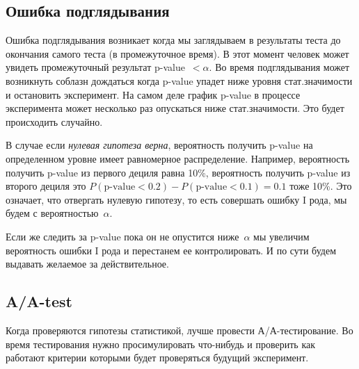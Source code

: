 \documentclass[../handbook.tex]{subfiles}
\begin{document}
\subsection{Ошибка подглядывания}
Ошибка подглядывания возникает когда мы заглядываем в результаты теста до
окончания самого теста (в промежуточное время). В этот момент человек может
увидеть промежуточный результат p-value~$< \alpha$. Во время подглядывания
может возникнуть соблазн дождаться когда p-value упадет ниже уровня
стат.значимости и остановить эксперимент. На самом деле график p-value в
процессе эксперимента может несколько раз опускаться ниже стат.значимости. Это
будет происходить случайно.


В случае если \emph{нулевая гипотеза верна}, вероятность получить p-value на
определенном уровне имеет равномерное распределение. Например, вероятность
получить p-value из первого дециля равна 10\%, вероятность получить p-value из
второго дециля это $P(\text{p-value} < 0.2) - P(\text{p-value} < 0.1) = 0.1$
тоже 10\%. Это означает, что отвергать нулевую гипотезу, то есть совершать ошибку I рода, мы будем с вероятностью~$\alpha$. 

Если же следить за p-value пока он не опустится ниже~$\alpha$ мы увеличим вероятность ошибки I рода и перестанем ее контролировать. И по сути будем выдавать желаемое за действительное.

\subsection{A/A-test}
Когда проверяются гипотезы статистикой, лучше провести
А/А-тес\-ти\-ро\-ва\-ние. Во время тестирования нужно просимулировать
что-нибудь и проверить как работают критерии которыми будет проверяться будущий
эксперимент.
\end{document}
